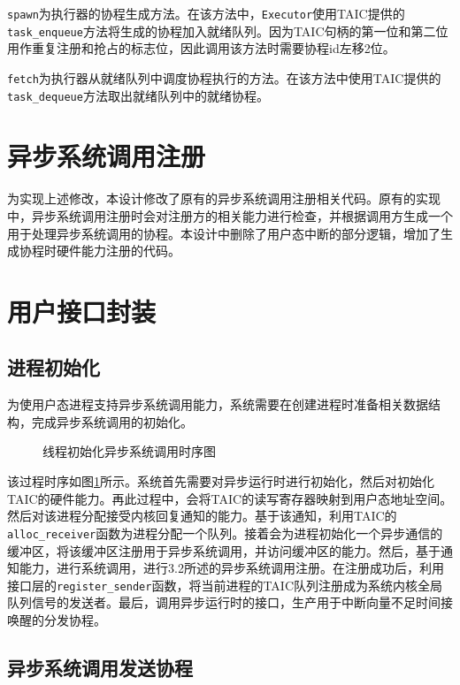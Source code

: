 \texttt{spawn}为执行器的协程生成方法。在该方法中，\texttt{Executor}使用TAIC提供的\texttt{task\_enqueue}方法将生成的协程加入就绪队列。因为TAIC句柄的第一位和第二位用作重复注册和抢占的标志位，因此调用该方法时需要协程id左移2位。

\texttt{fetch}为执行器从就绪队列中调度协程执行的方法。在该方法中使用TAIC提供的\texttt{task\_dequeue}方法取出就绪队列中的就绪协程。


\section{异步系统调用注册}

为实现上述修改，本设计修改了原有的异步系统调用注册相关代码。原有的实现中，异步系统调用注册时会对注册方的相关能力进行检查，并根据调用方生成一个用于处理异步系统调用的协程。本设计中删除了用户态中断的部分逻辑，增加了生成协程时硬件能力注册的代码。


\section{用户接口封装}

\subsection{进程初始化}

为使用户态进程支持异步系统调用能力，系统需要在创建进程时准备相关数据结构，完成异步系统调用的初始化。

\begin{figure}[htbp]
  \centering
  
  \caption{线程初始化异步系统调用时序图}\label{initsyscall}
\end{figure}

该过程时序如图\ref{initsyscall}所示。系统首先需要对异步运行时进行初始化，然后对初始化TAIC的硬件能力。再此过程中，会将TAIC的读写寄存器映射到用户态地址空间。然后对该进程分配接受内核回复通知的能力。基于该通知，利用TAIC的\texttt{alloc\_receiver}函数为进程分配一个队列。接着会为进程初始化一个异步通信的缓冲区，将该缓冲区注册用于异步系统调用，并访问缓冲区的能力。然后，基于通知能力，进行系统调用，进行3.2所述的异步系统调用注册。在注册成功后，利用接口层的\texttt{register\_sender}函数，将当前进程的TAIC队列注册成为系统内核全局队列信号的发送者。最后，调用异步运行时的接口，生产用于中断向量不足时间接唤醒的分发协程。


\subsection{异步系统调用发送协程}

